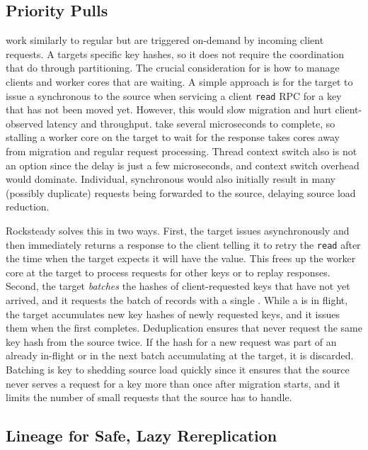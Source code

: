 \subsection{Priority Pulls}
\label{sec:priopulls}

\priopulls work similarly to regular \pulls but are triggered on-demand by
incoming client requests. A \priopull targets specific key hashes, so it
does not require the coordination that \pulls do through partitioning.
The crucial consideration for \priopulls is how to manage clients and worker
cores that are waiting. A simple approach is for the target to issue a
synchronous \priopull to
the source when servicing a client \texttt{read} RPC for a key that has
not been
moved yet. However, this would slow migration and hurt client-observed latency
and throughput. \priopulls take several microseconds to complete, so stalling a
worker core on the target to wait for the response takes cores away from
migration and regular request processing. Thread context switch also is not an
option since the delay is just a few microseconds, and context switch overhead
would dominate.  Individual, synchronous \priopulls would also initially result
in many (possibly duplicate) requests being forwarded to the source, delaying
source load reduction.

Rocksteady solves this in two ways. First, the target issues \priopulls
asynchronously and then immediately returns a response to the client telling it to
retry the \texttt{read} after the time when the target expects it will have the
value. This frees up the worker core at the target to process requests for
other keys or to replay \pull responses. Second, the target {\em batches} the
hashes of client-requested keys that have not yet arrived, and it
requests the batch of records with a single \priopull. While a
\priopull is in flight, the target accumulates new key hashes of newly
requested keys, and it issues them when the first \priopull completes.
Deduplication ensures that \priopulls never request the same key hash
from the source twice. If the hash for a new request was part of an already in-flight \priopull
or in the next batch accumulating at the target, it is
discarded.  Batching is key to shedding source load quickly since it ensures
that the source never serves a request for a key more than once after migration
starts, and it limits the number of small requests that the source has to
handle.

\subsection{Lineage for Safe, Lazy Rereplication}
\label{sec:log-dep}

